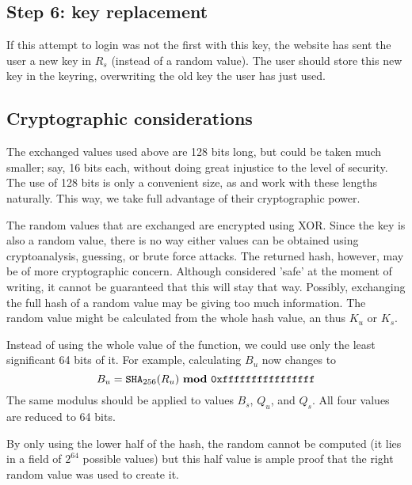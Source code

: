 \subsection{Step 6: key replacement}
\label{sec:login_step6}
If this attempt to login was not the first with this key,
the website has sent the user a new key in $R_s$ (instead of a random value).
The user should store this new key in the keyring, overwriting the old key the user has just used.

\subsection{Cryptographic considerations}
\label{sec:crypto}
The exchanged values used above are 128 bits long,
but could be taken much smaller;
say,
16 bits each,
without doing great injustice to the level of security.
The use of 128 bits is only a convenient size,
as  and  work with these lengths naturally.
This way,
we take full advantage of their cryptographic power.
\par
The random values that are exchanged are encrypted using XOR.
Since the key is also a random value,
there is no way either values can be obtained using cryptoanalysis,
guessing,
or brute force attacks.
The returned  hash,
however,
may be of more cryptographic concern.
Although considered 'safe' at the moment of writing,
it cannot be guaranteed that this will stay that way.
Possibly, exchanging the full hash of a random value may be giving too much information.
The random value might be calculated from the whole hash value, an thus $K_u$ or $K_s$.
\par
Instead of using the whole value of the  function,
we could use only the least significant 64 bits of it.
For example, calculating $B_u$ now changes to
\[B_u = \mathtt{SHA}_{256}(R_u)\  \mathbf{mod}\  \mathtt{0xffffffffffffffff}\]
The same modulus should be applied to values $B_s$, $Q_u$, and $Q_s$.
All four values are reduced to 64 bits.
\par
By only using the lower half of the hash, the random cannot be computed
(it lies in a field of $2^{64}$ possible values)
but this half value is ample proof that the right random value was used to create it.
